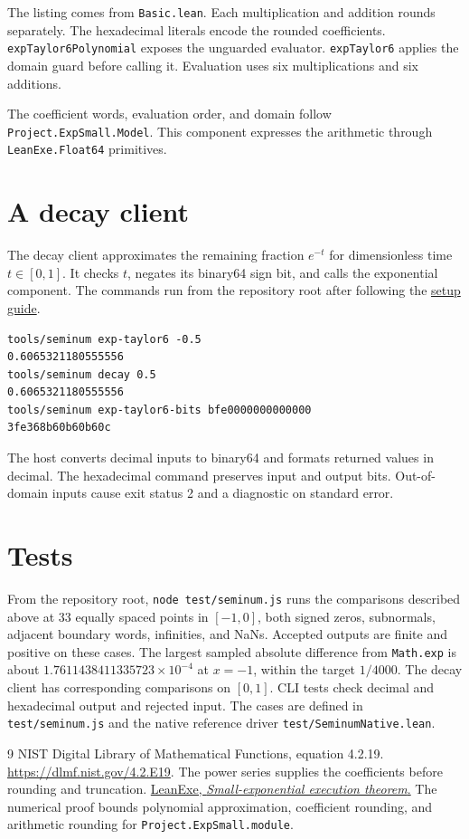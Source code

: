 The listing comes from \texttt{Basic.lean}.  Each multiplication and addition
rounds separately.  The hexadecimal literals encode the rounded coefficients.
\texttt{expTaylor6Polynomial} exposes the unguarded evaluator.
\texttt{expTaylor6} applies the domain guard before calling it.
Evaluation uses six multiplications and six additions.

The coefficient words, evaluation order, and domain follow
\texttt{Project.ExpSmall.Model}.  This component expresses the arithmetic
through \texttt{LeanExe.Float64} primitives.

\section{A decay client}
The decay client approximates the remaining fraction $e^{-t}$ for dimensionless
time $t\in[0,1]$.  It checks $t$, negates its binary64 sign bit, and calls the
exponential component.
The commands run from the repository root after following the
\href{https://github.com/jsmorph/leanexe/blob/lib1/DEVELOPING.md}{setup guide}.

\begin{lstlisting}
tools/seminum exp-taylor6 -0.5
0.6065321180555556
tools/seminum decay 0.5
0.6065321180555556
tools/seminum exp-taylor6-bits bfe0000000000000
3fe368b60b60b60c
\end{lstlisting}

The host converts decimal inputs to binary64 and formats returned values in
decimal.  The hexadecimal command preserves input and output bits.
Out-of-domain inputs cause exit status 2 and a diagnostic on standard error.

\section{Tests}
From the repository root, \texttt{node test/seminum.js} runs the comparisons
described above at 33 equally spaced points in $[-1,0]$, both signed zeros,
subnormals, adjacent boundary words, infinities, and NaNs.  Accepted outputs
are finite and positive on these cases.  The largest sampled absolute
difference from \texttt{Math.exp} is about $1.7611438411335723\times10^{-4}$
at $x=-1$, within the target $1/4000$.  The decay client has corresponding
comparisons on $[0,1]$.  CLI tests check decimal and hexadecimal output and
rejected input.  The cases are defined in \texttt{test/seminum.js} and the
native reference driver \texttt{test/SeminumNative.lean}.

\begin{thebibliography}{9}
 NIST Digital Library of Mathematical Functions, equation 4.2.19.
\url{https://dlmf.nist.gov/4.2.E19}.
The power series supplies the coefficients before rounding and truncation.
\href{https://github.com/jsmorph/leanexe/blob/lib1/proofs/talos/lean/Project/ExpSmall/Spec.lean}{LeanExe, \emph{Small-exponential execution theorem}.}
The numerical proof bounds polynomial approximation, coefficient rounding,
and arithmetic rounding for \texttt{Project.ExpSmall.module}.
\end{thebibliography}

